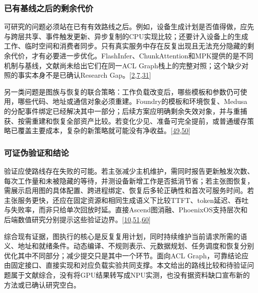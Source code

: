 \documentclass[
  UTF8,
  zihao=5]{ctexart}
\begin{document}
\hypertarget{ux5df2ux6709ux57faux7ebfux4e4bux540eux7684ux5269ux4f59ux4ee3ux4ef7}{%
\subsubsection{已有基线之后的剩余代价}\label{ux5df2ux6709ux57faux7ebfux4e4bux540eux7684ux5269ux4f59ux4ee3ux4ef7}}

可研究的问题必须站在已有有效路线之后。例如，设备生成计划是否值得做，应先与跨层共享、事件触发更新、异步复制的CPU实现比较；还要计入设备上的生成工作、临时空间和消费者同步。只有真实服务中存在反复出现且无法充分隐藏的剩余代价，才有必要进一步优化。FlashInfer、ChunkAttention和MPK提供的是不同机制与基线，文献尚未给出它们在同一ACL
Graph栈上的完整对照；这个缺少对照的事实本身不是已确认Research
Gap。{[}\protect\hyperlink{ref-ye2025flashinfer}{2},\protect\hyperlink{ref-ye2024chunkattention}{7},\protect\hyperlink{ref-cheng2026mpk}{31}{]}

另一类问题是图族与恢复的联合策略：工作负载改变后，哪些模板和参数仍可使用，哪些代码、地址或通信对象必须重建。Foundry的模板和环境恢复、Medusa的分配事件绑定已经解决其中一部分；后续方案应明确剩余失效对象，并与重捕获、按需重建和恢复全部资产比较。若变化少见、准备可完全提前，或普通缓存策略已覆盖主要成本，复杂的新策略就可能没有净收益。{[}\protect\hyperlink{ref-zeng2025medusa}{49},\protect\hyperlink{ref-liu2026foundry}{50}{]}

\hypertarget{ux53efux8bc1ux4f2aux9a8cux8bc1ux548cux7ed3ux8bba}{%
\subsubsection{可证伪验证和结论}\label{ux53efux8bc1ux4f2aux9a8cux8bc1ux548cux7ed3ux8bba}}

验证应使路线存在失败的可能。若主张减少主机维护，需同时报告更新触发次数、每次工作量和未被隐藏的等待，并测设备新增工作是否抵消节省；若主张图恢复，需展示启用图的具体配置、跨进程绑定、恢复后多轮正确性和首次可服务时间。若主张服务更快，还应在固定资源和相同生成语义下比较TTFT、token延迟、吞吐与失败率，而非只给单次回放时延。直接Ascend图消融、PhoenixOS支持层次和后端数值研究分别提示这些验证边界。{[}\protect\hyperlink{ref-liu2025xllm}{10},\protect\hyperlink{ref-wei2025phoenixos}{51},\protect\hyperlink{ref-pape2026backend}{60}{]}

综合现有证据，图执行的核心是反复复用计划，同时持续维护当前请求所需的语义、地址和就绪条件。动态编译、不规则表示、元数据规划、任务调度和恢复分别优化其中不同部分；减少提交只是其中一个环节。面向ACL
Graph，可靠结论应由固定接口、直接实现和对应负载实验共同支撑。本文给出的路线比较和待验证问题属于文献综合，没有将GPU结果转写成NPU实测，也没有据资料缺口宣布新的方法或已确认研究空白。
\end{document}

